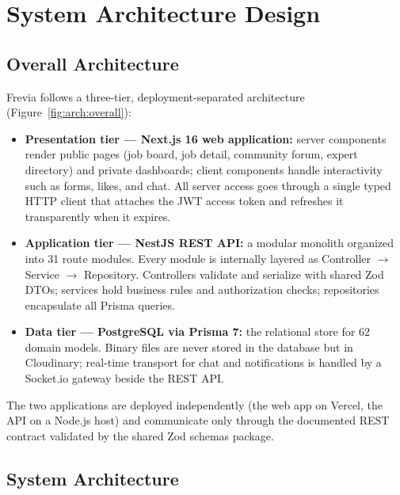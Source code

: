 \section{System Architecture Design}

\subsection{Overall Architecture}

Frevia follows a three-tier, deployment-separated architecture (Figure~\ref{fig:arch:overall}):

\begin{itemize}[leftmargin=*]
    \item \textbf{Presentation tier --- Next.js 16 web application:} server components render public pages (job board, job detail, community forum, expert directory) and private dashboards; client components handle interactivity such as forms, likes, and chat. All server access goes through a single typed HTTP client that attaches the JWT access token and refreshes it transparently when it expires.
    \item \textbf{Application tier --- NestJS REST API:} a modular monolith organized into 31 route modules. Every module is internally layered as Controller $\rightarrow$ Service $\rightarrow$ Repository. Controllers validate and serialize with shared Zod DTOs; services hold business rules and authorization checks; repositories encapsulate all Prisma queries.
    \item \textbf{Data tier --- PostgreSQL via Prisma 7:} the relational store for 62 domain models. Binary files are never stored in the database but in Cloudinary; real-time transport for chat and notifications is handled by a Socket.io gateway beside the REST API.
\end{itemize}


The two applications are deployed independently (the web app on Vercel, the API on a Node.js host) and communicate only through the documented REST contract validated by the shared Zod schemas package.

\subsection{System Architecture}

